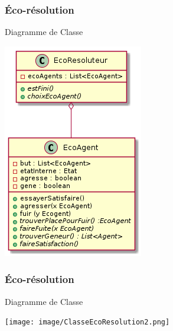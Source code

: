 
\begin{frame}
    \frametitle{Éco-résolution}
    
    		\begin{block}{Diagramme de Classe}
    		\begin{center}
     \includegraphics[scale=0.4]{images/ClasseEcoResolution1.png}
    \end{center}
    		    

    		\end{block}

\end{frame}

\begin{frame}
    \frametitle{Éco-résolution}
    		\begin{block}{Diagramme de Classe}
    		\begin{center}
    		
    		     \texttt{[image: image/ClasseEcoResolution2.png]}
    		\end{center}

    		\end{block}

\end{frame}

